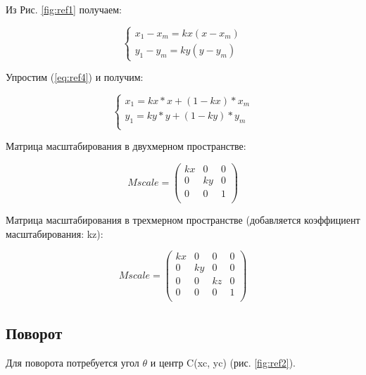 Из Рис. \ref{fig:ref1} получаем:

\begin{equation}
	{\begin{cases}
			x_1 - x_m = kx(x - x_m) \\
			y_1 - y_m = ky(y - y_m)
			\label{eq:ref4}
		\end{cases}}
\end{equation}

Упростим (\ref{eq:ref4}) и получим:

\begin{equation}
	{\begin{cases}
			x_1 = kx * x + (1 - kx) * x_m \\
			y_1 = ky * y + (1 - ky) * y_m \\
		\end{cases}}
\end{equation}

Матрица масштабирования в двухмерном пространстве:

\begin{equation}
	Mscale = \left(
	\begin{array}{cccc}
			kx & 0  & 0 \\
			0  & ky & 0 \\
			0  & 0  & 1 \\
		\end{array}
	\right)
\end{equation}

Матрица масштабирования в трехмерном пространстве (добавляется коэффициент масштабирования: kz):

\begin{equation}
	Mscale = \left(
	\begin{array}{cccc}
			kx & 0  & 0  & 0 \\
			0  & ky & 0  & 0 \\
			0  & 0  & kz & 0 \\
			0  & 0  & 0  & 1 \\
		\end{array}
	\right)
\end{equation}

\subsection {Поворот}

Для поворота потребуется угол  $\theta$ и центр C(xc, yc) (рис. \ref{fig:ref2}).
\begin{figure}[ht!]
\end{figure}

